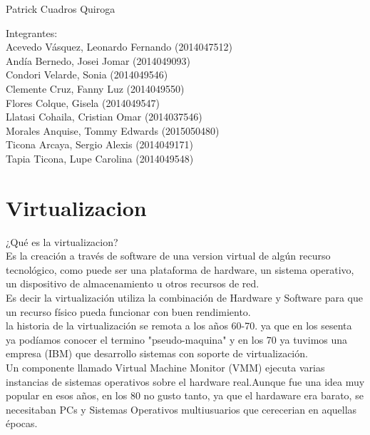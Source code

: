 \documentclass[12pt,letterpaper]{article}
\begin{document}
\begin{titlepage}
\begin{center}
\vspace*{0.1in}
\begin{large}
 Patrick Cuadros Quiroga\\
\end{large}

\vspace*{0.2in}
\vspace*{0.1in}
\begin{large}
Integrantes: \\
Acevedo Vásquez, Leonardo Fernando 	(2014047512) \\
Andía Bernedo, Josei Jomar 			(2014049093) \\
Condori Velarde, Sonia          	(2014049546) \\
Clemente Cruz, Fanny Luz    		(2014049550) \\
Flores Colque, Gisela           	(2014049547) \\
Llatasi Cohaila, Cristian Omar		(2014037546) \\
Morales Anquise, Tommy Edwards 		(2015050480) \\
Ticona Arcaya, Sergio Alexis		(2014049171) \\
Tapia Ticona, Lupe Carolina			(2014049548) \\


\end{large}
\end{center}

\end{titlepage}

  \tableofcontents
 \newpage


\section{Virtualizacion} 

¿Qué es la virtualizacion? \\
Es la creación a través de software de una version virtual de algún recurso tecnológico, como puede ser una plataforma de hardware, un sistema operativo, un dispositivo de almacenamiento u otros recursos de red.  \\

Es decir la virtualización utiliza la combinación de Hardware y Software para que un recurso físico pueda funcionar con buen rendimiento.  \\

la historia de la virtualización se remota a los años 60-70. ya que en los sesenta ya podíamos conocer el termino "pseudo-maquina" y en los 70 ya tuvimos una empresa (IBM) que desarrollo sistemas con soporte de virtualización. \\
Un componente llamado Virtual Machine Monitor (VMM) ejecuta varias instancias de sistemas operativos sobre el hardware real.Aunque fue una idea muy popular en esos años, en los 80 no gusto tanto, ya que el hardaware era barato, se necesitaban PCs y Sistemas Operativos multiusuarios que cerecerian en aquellas épocas.  \\ 
\end{document}
